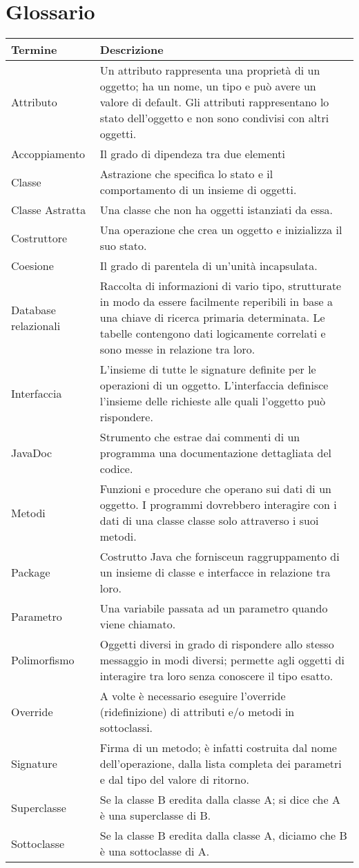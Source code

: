\chapter{Glossario}
\begin{center}
\begin{longtable}{lp{}}
\hline 
\rowcolor[gray]{.80}
\textbf{Termine} & \textbf{Descrizione} \tabularnewline
\hline 
Attributo & 
Un attributo rappresenta una proprietà di un oggetto; ha un nome, un tipo e può avere un valore di default. Gli attributi rappresentano lo stato dell'oggetto e non sono condivisi con altri oggetti.
\tabularnewline
\hline
Accoppiamento & 
Il grado di dipendeza tra due elementi
\tabularnewline
\hline
Classe & 
Astrazione che specifica lo stato e il comportamento di un insieme di oggetti.
\tabularnewline
\hline
Classe Astratta & 
Una classe che non ha oggetti istanziati da essa.
\tabularnewline
\hline
Costruttore & 
Una operazione che crea un oggetto e inizializza il suo stato.
\tabularnewline
\hline
Coesione & 
Il grado di parentela di un'unità incapsulata.
\tabularnewline
\hline
Database relazionali & 
Raccolta di informazioni di vario tipo, strutturate in modo da essere facilmente reperibili in base a una chiave di ricerca primaria determinata. Le tabelle contengono dati logicamente correlati e sono messe in relazione tra loro.
\tabularnewline
\hline
Interfaccia & 
L'insieme di tutte le signature definite per le operazioni di un oggetto. L'interfaccia definisce l'insieme delle richieste alle quali l'oggetto può rispondere.
\tabularnewline
\hline
JavaDoc & 
Strumento che estrae dai commenti di un programma una documentazione dettagliata del codice.
\tabularnewline
\hline
Metodi & 
Funzioni e procedure che operano sui dati di un oggetto. I programmi dovrebbero interagire con i dati di una classe classe solo attraverso i suoi metodi.
\tabularnewline
\hline
Package & 
Costrutto Java che fornisceun raggruppamento di un insieme di classe e interfacce in relazione tra loro.
\tabularnewline
\hline
Parametro & 
Una variabile passata ad un parametro quando viene chiamato. 
\tabularnewline
\hline
Polimorfismo & 
Oggetti diversi in grado di rispondere allo stesso messaggio in modi diversi; permette agli oggetti di interagire tra loro senza conoscere il tipo esatto.
\tabularnewline
\hline
Override & 
A volte è necessario eseguire l'override (ridefinizione) di attributi e/o metodi in sottoclassi.
\tabularnewline
\hline
Signature & 
Firma di un metodo; è infatti costruita dal nome dell'operazione, dalla lista completa dei parametri e dal tipo del valore di ritorno.
\tabularnewline
\hline
Superclasse & 
Se la classe B eredita dalla classe A; si dice che A è una superclasse di B.
\tabularnewline
\hline
Sottoclasse & 
Se la classe B eredita dalla classe A, diciamo che B è una sottoclasse di A.
\tabularnewline
\hline
\end{longtable}
\end{center}




